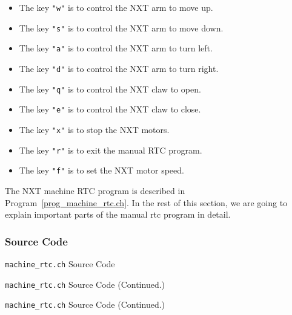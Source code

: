 \documentclass[11pt]{article}
\begin{document}
\begin{itemize}
\item The key \verb+"w"+ is to control the NXT arm to move up.
\item The key \verb+"s"+ is to control the NXT arm to move down.
\item The key \verb+"a"+ is to control the NXT arm to turn left.
\item The key \verb+"d"+ is to control the NXT arm to turn right.
\item The key \verb+"q"+ is to control the NXT claw to open.
\item The key \verb+"e"+ is to control the NXT claw to close.
\item The key \verb+"x"+ is to stop the NXT motors.
\item The key \verb+"r"+ is to exit the manual RTC program.
\item The key \verb+"f"+ is to set the NXT motor speed.
\end{itemize}
The NXT machine RTC program is described in Program~\ref{prog_machine_rtc.ch}. In the rest of this section, 
we are going to explain important parts of the manual rtc program in detail.

\subsubsection*{Source Code}

\begin{Program}[H]
    {\small}
    \caption{\texttt{machine\_rtc.ch} Source Code\label{prog_machine_rtc.ch}}
\end{Program}
\addtocounter{Program}{-1}
\begin{Program}[H]
    {\small}
    \caption{\texttt{machine\_rtc.ch} Source Code (Continued.)\label{prog_machine_rtc.ch}}
\end{Program}
\addtocounter{Program}{-1}
\begin{Program}[H]
    {\small}
    \caption{\texttt{machine\_rtc.ch} Source Code (Continued.)\label{prog_machine_rtc.ch}}
\end{Program}
\end{document}
